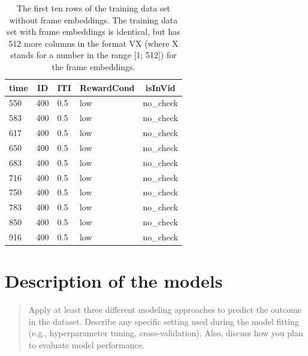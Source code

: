 \documentclass[
  man]{apa6}
\begin{document}
\begin{table}[tbp]

\begin{center}
\begin{threeparttable}

\caption{\label{tab:datatable}The first ten rows of the training data set without frame embeddings. The training data set with frame embeddings is identical, but has 512 more columns in the format VX (where X stands for a number in the range [1; 512]) for the frame embeddings.}

\begin{tabular}{lllll}
\toprule
time & \multicolumn{1}{c}{ID} & \multicolumn{1}{c}{ITI} & \multicolumn{1}{c}{RewardCond} & \multicolumn{1}{c}{isInVid}\\
\midrule
550 & 400 & 0.5 & low & no\_check\\
583 & 400 & 0.5 & low & no\_check\\
617 & 400 & 0.5 & low & no\_check\\
650 & 400 & 0.5 & low & no\_check\\
683 & 400 & 0.5 & low & no\_check\\
716 & 400 & 0.5 & low & no\_check\\
750 & 400 & 0.5 & low & no\_check\\
783 & 400 & 0.5 & low & no\_check\\
850 & 400 & 0.5 & low & no\_check\\
916 & 400 & 0.5 & low & no\_check\\
\bottomrule
\end{tabular}

\end{threeparttable}
\end{center}

\end{table}

\hypertarget{description-of-the-models}{%
\section{Description of the models}\label{description-of-the-models}}

\begin{quote}
Apply at least three different modeling approaches to predict the outcome in the dataset. Describe any specific setting used during the model fitting (e.g., hyperparameter tuning, cross-validation). Also, discuss how you plan to evaluate model performance.
\end{quote}
\end{document}
